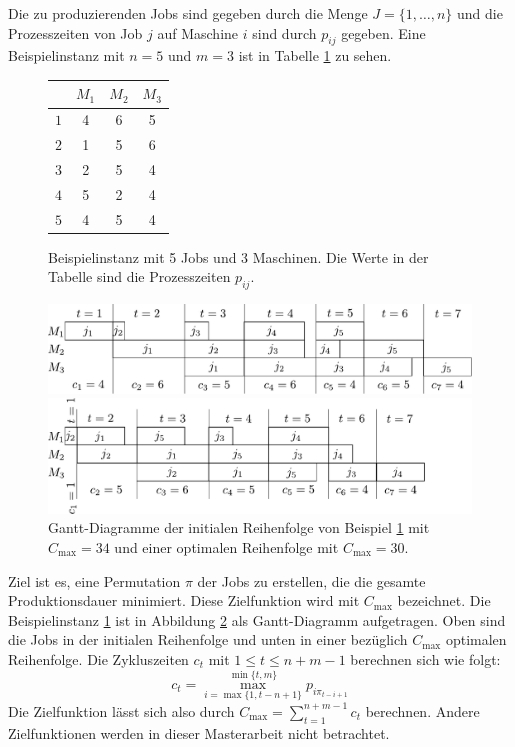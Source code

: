 \documentclass{scrreprt}
\begin{document}
Die zu produzierenden Jobs sind gegeben durch die Menge $J=\{1,\ldots,n\}$ 
und die Prozesszeiten von Job $j$ auf Maschine $i$ sind durch $p_{ij}$ gegeben.
Eine Beispielinstanz mit $n=5$ und $m=3$ ist in Tabelle \ref{abb:Bsp} zu sehen.
\begin{figure}[h]
    \begin{center}
        \begin{tabular}{c|ccc}
            & $M_1$ & $M_2$ & $M_3$ \\ \hline
            $1$ & 4 & 6 & 5 \\
            $2$ & 1 & 5 & 6 \\
            $3$ & 2 & 5 & 4 \\
            $4$ & 5 & 2 & 4 \\
            $5$ & 4 & 5 & 4
        \end{tabular}
    \end{center}
    \caption{
        \label{abb:Bsp}
        Beispielinstanz mit 5 Jobs und 3 Maschinen. Die Werte in der Tabelle sind die Prozesszeiten $p_{ij}$.
    }
\end{figure}
\begin{figure}
    \begin{center}
        \includegraphics[width=.8\textwidth]{graphics/bspinit.pdf}
    \end{center}
    \begin{center}
        \includegraphics[width=.8\textwidth]{graphics/bspopt.pdf}
    \end{center}
    \caption{
        \label{abb:gantt}
        Gantt-Diagramme der initialen Reihenfolge von Beispiel \ref{abb:Bsp} mit $C_{\max}=34$
        und einer optimalen Reihenfolge mit $C_{\max}=30$.
    }
\end{figure}
Ziel ist es, eine Permutation $\pi$ der Jobs zu erstellen, die die gesamte Produktionsdauer minimiert.
Diese Zielfunktion wird mit $C_{\max}$ bezeichnet.
Die Beispielinstanz \ref{abb:Bsp} ist in Abbildung \ref{abb:gantt} als Gantt-Diagramm aufgetragen.
Oben sind die Jobs in der initialen Reihenfolge und unten in einer bezüglich $C_{\max}$ optimalen Reihenfolge.
Die Zykluszeiten $c_t$ mit $1\leq t\leq n+m-1$ berechnen sich wie folgt:
\[ c_t = \max_{i=\max\{1,t-n+1\}}^{\min\{t,m\}} p_{i\pi_{t-i+1}} \]
Die Zielfunktion lässt sich also durch $C_{\max} = \sum_{t=1}^{n+m-1} c_t$ berechnen.
Andere Zielfunktionen werden in dieser Masterarbeit nicht betrachtet.
\end{document}
